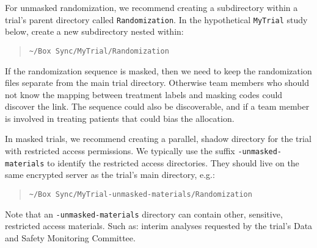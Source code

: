 \documentclass[
]{book}
\begin{document}
For unmasked randomization, we recommend creating a subdirectory within a trial's parent directory called \texttt{Randomization}. In the hypothetical \texttt{MyTrial} study below, create a new subdirectory nested within:

\begin{quote}
\texttt{\textasciitilde{}/Box\ Sync/MyTrial/Randomization}
\end{quote}

If the randomization sequence is masked, then we need to keep the randomization files separate from the main trial directory. Otherwise team members who should not know the mapping between treatment labels and masking codes could discover the link. The sequence could also be discoverable, and if a team member is involved in treating patients that could bias the allocation.

In masked trials, we recommend creating a parallel, shadow directory for the trial with restricted access permissions. We typically use the suffix \texttt{-unmasked-materials} to identify the restricted access directories. They should live on the same encrypted server as the trial's main directory, e.g.:

\begin{quote}
\texttt{\textasciitilde{}/Box\ Sync/MyTrial-unmasked-materials/Randomization}
\end{quote}

Note that an \texttt{-unmasked-materials} directory can contain other, sensitive, restricted access materials. Such as: interim analyses requested by the trial's Data and Safety Monitoring Committee.
\end{document}
